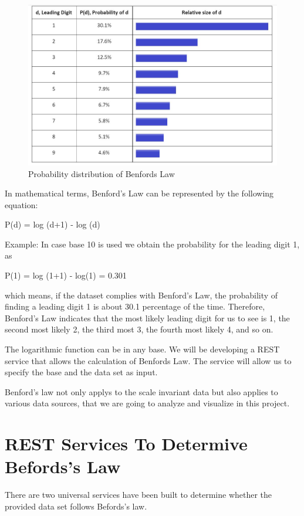 \begin{figure}[!ht]
\centering\includegraphics[width=\columnwidth]{images/benfords_law.JPG}
  \caption{Probability distribution of Benfords Law}\label{f:probability-dist-benfordlaw}
\end{figure}


In mathematical terms, Benford’s Law can be represented 
by the following equation:

P(d) = log (d+1) - log (d)

Example: In case base 10 is used we obtain the 
probability for the leading digit 1, as

P(1) = log (1+1) - log(1) = 0.301

which means, if the dataset complies 
with Benford's Law, the probability of finding a 
leading digit 1 is about 30.1 percentage of the time. 
Therefore, Benford’s Law indicates that the most 
likely leading digit for us to see is 1, the second 
most likely 2, the third most 3, the fourth most 
likely 4, and so on.

The logarithmic function can be in any base. We will 
be developing a REST service that allows the 
calculation of Benfords Law. The service will allow 
us to specify the base and the data set as input.

Benford’s law not only applys to the scale invariant 
data but also applies to various data sources, 
that we are going to analyze and visualize in this project.


\section{REST Services To Determive Befords's Law}

There are two universal services have been built to determine
whether the provided data set follows Befords's law.

